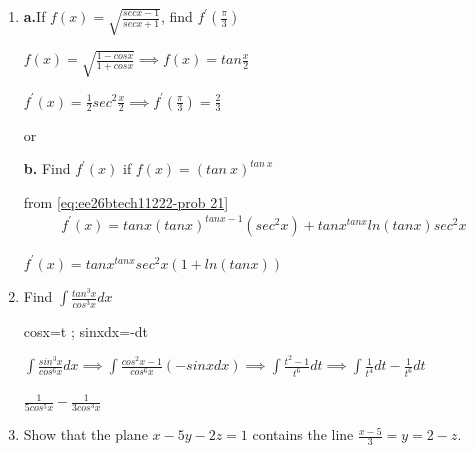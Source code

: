 \begin{enumerate}[label=\thesubsection.\arabic*, ref=\thesubsection.\theenumi]
If $A=\myvec{-3&2\\ 1&-1}$ and $I=\myvec{1&0\\ 0&1\\}$ find scalar k so that $A^{2}+I=kA.$

\solution

$\vert{}A-\lambda I\vert{}= 0 \implies \left|\begin{matrix}
    -3-\lambda & 2\\ 1& -1-\lambda\end{matrix} \right|= 0$

    $\lambda^2+ 4\lambda +1=0 \implies A^2 +I= -4A \implies k=-4$


\item

\textbf{a.}If $f(x) =\sqrt{\frac{secx - 1}{secx + 1}}$, find $f^\prime {(\frac{\pi}{3})}$


\solution

$f(x)= \sqrt{\frac{1-cosx}{1+cosx}} \implies f(x)= tan\frac{x}{2}$

$f^\prime (x) = \frac{1}{2}{sec^2\frac{x}{2}} \implies  f^\prime(\frac{\pi}{3}) = \frac{2}{3}$

\begin{center}
    or 
\end{center}


\textbf{b.} Find $f^\prime(x)$ if $f(x)=(tan~x)^{tan~x}$

\solution

from \eqref{eq:ee26btech11222-prob 21}
\begin{align}
	f^\prime(x)= tanx(tanx)^{tanx -1}(sec^2x) + tanx^{tanx}ln(tanx)sec^2x
\end{align}

$f^\prime(x)= tanx^{tanx}sec^2x\left(1 +ln(tanx)\right)$

\item

Find $\int \frac{tan^3x}{cos^3x}dx$

\solution

cosx=t ; sinxdx=-dt

$\int \frac{sin^3x}{cos^6x}dx  \implies \int \frac{cos^2x-1}{cos^6x}(-sinxdx) \implies \int \frac{t^2-1}{t^6}dt \implies \int \frac{1}{t^4}dt-\frac{1}{t^6}dt$

$\frac{1}{5cos^5x}-\frac{1}{3cos^3x}$

\item 

Show that the plane $x-5y-2z=1$ contains the line $\frac{x-5}{3}=y=2-z.$ 


\end{enumerate}
